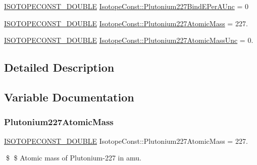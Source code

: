 \begin{DoxyCompactItemize}
\mbox{\hyperlink{group___isotope_const-_macros_ga8f45a7272ce02c0b4c65c44636ed719a}{I\+S\+O\+T\+O\+P\+E\+C\+O\+N\+S\+T\+\_\+\+D\+O\+U\+B\+LE}} \mbox{\hyperlink{group___isotope_const-_plutonium-_pu227_gadaa3041cb537f5b09b1bfcd102164420}{Isotope\+Const\+::\+Plutonium227\+Bind\+E\+Per\+A\+Unc}} = 0
\item 
\mbox{\hyperlink{group___isotope_const-_macros_ga8f45a7272ce02c0b4c65c44636ed719a}{I\+S\+O\+T\+O\+P\+E\+C\+O\+N\+S\+T\+\_\+\+D\+O\+U\+B\+LE}} \mbox{\hyperlink{group___isotope_const-_plutonium-_pu227_gad68d2d98ad9bbc8a16addd33924c5e34}{Isotope\+Const\+::\+Plutonium227\+Atomic\+Mass}} = 227.
\item 
\mbox{\hyperlink{group___isotope_const-_macros_ga8f45a7272ce02c0b4c65c44636ed719a}{I\+S\+O\+T\+O\+P\+E\+C\+O\+N\+S\+T\+\_\+\+D\+O\+U\+B\+LE}} \mbox{\hyperlink{group___isotope_const-_plutonium-_pu227_ga4fa3f91a7b2ac65012d1d8dbdcc478b8}{Isotope\+Const\+::\+Plutonium227\+Atomic\+Mass\+Unc}} = 0.
\end{DoxyCompactItemize}


\subsection{Detailed Description}


\subsection{Variable Documentation}
\mbox{\label{group___isotope_const-_plutonium-_pu227_gad68d2d98ad9bbc8a16addd33924c5e34}} 
\subsubsection{\texorpdfstring{Plutonium227\+Atomic\+Mass}{Plutonium227AtomicMass}}
{\footnotesize\ttfamily \mbox{\hyperlink{group___isotope_const-_macros_ga8f45a7272ce02c0b4c65c44636ed719a}{I\+S\+O\+T\+O\+P\+E\+C\+O\+N\+S\+T\+\_\+\+D\+O\+U\+B\+LE}} Isotope\+Const\+::\+Plutonium227\+Atomic\+Mass = 227.}

\$ \$ Atomic mass of Plutonium-\/227 in amu. \mbox{\label{group___isotope_const-_plutonium-_pu227_ga4fa3f91a7b2ac65012d1d8dbdcc478b8}} 
